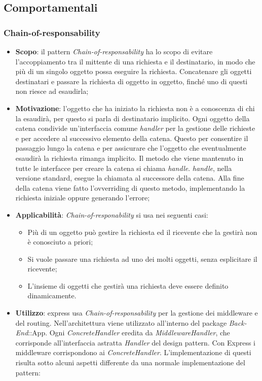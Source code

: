\subsection{Comportamentali}
\subsubsection{Chain-of-responsability}
\begin{itemize}
\item \textbf{Scopo}: il pattern \textit{Chain-of-responsability} ha lo scopo di evitare l'accoppiamento tra il mittente di una richiesta e il destinatario, in modo che più di un singolo oggetto possa eseguire la richiesta. Concatenare gli oggetti destinatari e passare la richiesta di oggetto in oggetto, finché uno di questi non riesce ad esaudirla;
\item \textbf{Motivazione}: l'oggetto che ha iniziato la richiesta non è a conoscenza di chi la esaudirà, per questo si parla di destinatario implicito. Ogni oggetto della catena condivide un'interfaccia comune \textit{handler} per la gestione delle richieste e per accedere al successivo elemento della catena. Questo per consentire il passaggio lungo la catena e per assicurare che l'oggetto che eventualmente esaudirà la richiesta rimanga implicito. Il metodo che viene mantenuto in tutte le interfacce per creare la catena si chiama \textit{handle}. \textit{handle}, nella versione standard, esegue la chiamata al successore della catena. Alla fine della catena viene fatto l'ovverriding di questo metodo, implementando la richiesta iniziale oppure generando l'errore;
\item \textbf{Applicabilità}: \textit{Chain-of-responability} si usa nei seguenti casi:
	\begin{itemize}
		\item Più di un oggetto può gestire la richiesta ed il ricevente che la gestirà non è conosciuto a priori;
		\item Si vuole passare una richiesta ad uno dei molti oggetti, senza esplicitare il ricevente;
		\item L'insieme di oggetti che gestirà una richiesta deve essere definito dinamicamente.
	\end{itemize}
\item \textbf{Utilizzo}: express usa \textit{Chain-of-responsability} per la gestione dei middleware e del routing. Nell'architettura viene utilizzato all'interno del package \textit{Back-End}::App. Ogni \textit{ConcreteHandler} eredita da \textit{MiddlewareHandler}, che corrisponde all'interfaccia astratta \textit{Handler} del design pattern. Con Express i middleware corrispondono ai \textit{ConcreteHandler}. L'implementazione di questi risulta sotto alcuni aspetti differente da una normale implementazione del pattern:

\end{itemize}
